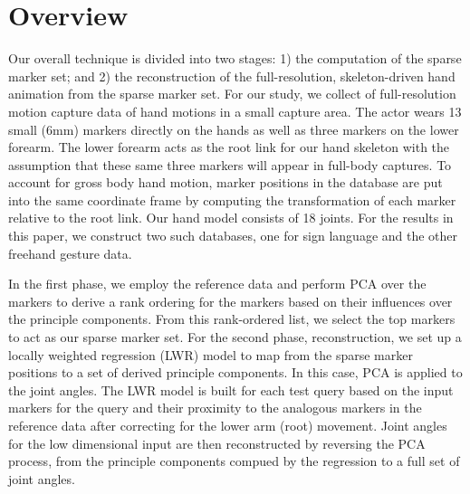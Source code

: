 
\section{Overview}

Our overall technique is divided into two stages: 1) the computation of the sparse marker set; and 2) the reconstruction of the full-resolution, skeleton-driven hand animation from the sparse marker set. 
For our study, we collect of full-resolution motion capture data of hand motions in a small capture area. 
The actor wears 13 small (6mm) markers directly on the hands as well as three markers on the lower forearm. The lower forearm acts as the root link for our hand skeleton with the assumption that these same three markers will appear in full-body captures. 
To account for gross body hand motion, marker positions in the database are put into the same coordinate frame by computing the transformation of each marker relative to the root link. Our hand model consists of 18 joints. %
For the results in this paper, we construct two such databases, one for sign language and the other freehand gesture data.

In the first phase, we employ the reference data and perform PCA over the markers to derive a rank ordering for the markers based on their influences over the principle components. From this rank-ordered list, we select the top markers to act as our sparse marker set.
For the second phase, reconstruction, we set up a locally weighted regression (LWR) model to map from the sparse marker positions to a set of derived principle components.  In this case, PCA is applied to the joint angles. The LWR model is built for each test query based on the input markers for the query and their proximity to the analogous markers in the reference data after correcting for the lower arm (root) movement.
%
Joint angles for the low dimensional input are then reconstructed by reversing the PCA process, from the principle components compued by the regression to a full set of joint angles. 
